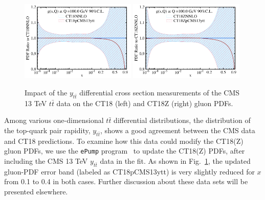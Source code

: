 \begin{figure}[h]
	\includegraphics[width=0.49\textwidth]{./fig/sec6/pdfs_CT18NNLO-58_CT18pCMS13ytt_100-0GeV_S90CL__00___glu__pdfr_cus-lin.pdf}
	\includegraphics[width=0.49\textwidth]{./fig/sec6/pdfs_CT18ZNNLO-58_CT18ZpCMS13ytt_100-0GeV_S90CL__00___glu__pdfr_cus-lin.pdf}
	\caption{Impact of the $y_{t \bar t}$ differential cross section measurements of the CMS 13 TeV $t \bar t$ data on the CT18 (left) and CT18Z (right) gluon PDFs. 
	\label{fig:cms13ytt}}
\end{figure}

%
Among various one-dimensional $t \bar{t}$ differential distributions, the distribution of the top-quark pair rapidity, $y_{t \bar t}$, shows a good agreement between the CMS data and CT18 predictions. 
To examine how this data could modify the CT18(Z) gluon PDFs, we use the \texttt{ePump} program~\cite{Hou:2019gfw} to update the CT18(Z) PDFs, after including the CMS 13 TeV $y_{t \bar t}$ data in the fit. 
As shown in Fig.~\ref{fig:cms13ytt}, the updated gluon-PDF error band (labeled as CT18pCMS13ytt) is very slightly reduced for $x$ from 0.1 to 0.4 in both cases.
Further discussion about these data sets will be presented elsewhere. 

